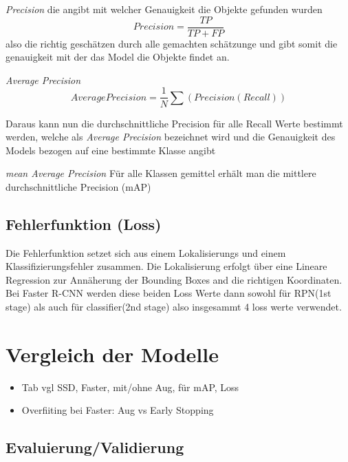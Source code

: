 \textit{Precision}
die angibt mit welcher Genauigkeit die Objekte gefunden wurden
\begin{equation}
  Precision = \frac{TP}{TP + FP}
\end{equation}
also die richtig 
geschätzen durch alle gemachten schätzunge und gibt somit die 
genauigkeit mit der das Model die Objekte findet an.


\textit{Average Precision}
\begin{equation}
  Average Precision = \frac{1}{N}\sum(Precision(Recall))
\end{equation}

Daraus kann nun die durchschnittliche Precision für alle Recall 
Werte bestimmt werden, welche als \textit{Average Precision}
bezeichnet wird und die Genauigkeit des Models bezogen auf 
eine bestimmte Klasse angibt

\textit{mean Average Precision}
Für alle Klassen gemittel 
erhält man die mittlere durchschnittliche Precision (mAP)



\subsection*{Fehlerfunktion (Loss)}
Die Fehlerfunktion setzet sich aus einem Lokalisierungs und einem 
Klassifizierungsfehler zusammen. 
Die Lokalisierung erfolgt über eine Lineare Regression zur 
Annäherung der Bounding Boxes and die richtigen Koordinaten.\\

Bei Faster R-CNN werden diese beiden Loss Werte dann sowohl für 
RPN(1st stage) als auch für classifier(2nd stage) also 
insgesammt 4 loss werte verwendet.



\section{Vergleich der Modelle}
\begin{itemize}
  \item Tab vgl SSD, Faster, mit/ohne Aug, für mAP, Loss
  \item Overfiiting bei Faster: Aug vs Early Stopping
\end{itemize}

\subsection{Evaluierung/Validierung}

